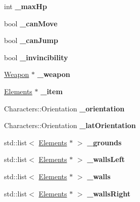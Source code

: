 \begin{DoxyCompactItemize}
\item 
\hypertarget{class_characters_abc14e96e35df47aba94dbf23b3dbdba6}{int {\bfseries \+\_\+max\+Hp}}\label{class_characters_abc14e96e35df47aba94dbf23b3dbdba6}

\item 
\hypertarget{class_characters_a817a390b358c806dd3e5c353a815871c}{bool {\bfseries \+\_\+can\+Move}}\label{class_characters_a817a390b358c806dd3e5c353a815871c}

\item 
\hypertarget{class_characters_a7488ab360a4a770d46a2578f87f02511}{bool {\bfseries \+\_\+can\+Jump}}\label{class_characters_a7488ab360a4a770d46a2578f87f02511}

\item 
\hypertarget{class_characters_a6a43d519e518708eddef2438dae04a1f}{bool {\bfseries \+\_\+invincibility}}\label{class_characters_a6a43d519e518708eddef2438dae04a1f}

\item 
\hypertarget{class_characters_aee5f545db9a5e0ee19af66dc0754b602}{\hyperlink{class_weapon}{Weapon} $\ast$ {\bfseries \+\_\+weapon}}\label{class_characters_aee5f545db9a5e0ee19af66dc0754b602}

\item 
\hypertarget{class_characters_a0befc3d5cf681d5cd555929ffde0d25a}{\hyperlink{class_elements}{Elements} $\ast$ {\bfseries \+\_\+item}}\label{class_characters_a0befc3d5cf681d5cd555929ffde0d25a}

\item 
\hypertarget{class_characters_ad1f8866efe25f7c8997a134f536fe121}{Characters\+::\+Orientation {\bfseries \+\_\+orientation}}\label{class_characters_ad1f8866efe25f7c8997a134f536fe121}

\item 
\hypertarget{class_characters_a1d78d9a93ebfad3f058a155505257c91}{Characters\+::\+Orientation {\bfseries \+\_\+lat\+Orientation}}\label{class_characters_a1d78d9a93ebfad3f058a155505257c91}

\item 
\hypertarget{class_characters_a35ee6e0ded905f63112a08cd3ad76435}{std\+::list$<$ \hyperlink{class_elements}{Elements} $\ast$ $>$ {\bfseries \+\_\+grounds}}\label{class_characters_a35ee6e0ded905f63112a08cd3ad76435}

\item 
\hypertarget{class_characters_a7a12ea35974e9b9d5fce08b194c37df0}{std\+::list$<$ \hyperlink{class_elements}{Elements} $\ast$ $>$ {\bfseries \+\_\+walls\+Left}}\label{class_characters_a7a12ea35974e9b9d5fce08b194c37df0}

\item 
\hypertarget{class_characters_af296e78457066933b426e1a1e950a9d4}{std\+::list$<$ \hyperlink{class_elements}{Elements} $\ast$ $>$ {\bfseries \+\_\+walls}}\label{class_characters_af296e78457066933b426e1a1e950a9d4}

\item 
\hypertarget{class_characters_a60b4de9d954c3de8093bfce23e0e0cec}{std\+::list$<$ \hyperlink{class_elements}{Elements} $\ast$ $>$ {\bfseries \+\_\+walls\+Right}}\label{class_characters_a60b4de9d954c3de8093bfce23e0e0cec}

\end{DoxyCompactItemize}
